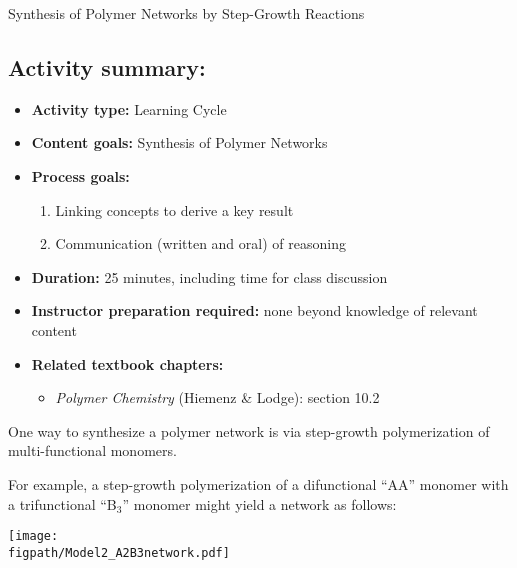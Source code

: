 \begin{activity}[extension]{Synthesis of Polymer Networks by Step-Growth Reactions}
\begin{instructornotes}
	\subsection*{Activity summary:}
	\begin{itemize}
		\item \textbf{Activity type:} Learning Cycle
		\item \textbf{Content goals:} Synthesis of Polymer Networks
		\item \textbf{Process goals:} %
			\begin{enumerate}
				\item Linking concepts to derive a key result
				\item Communication (written and oral) of reasoning
			\end{enumerate}
		\item \textbf{Duration:} 25 minutes, including time for class discussion
		\item \textbf{Instructor preparation required:} none beyond knowledge of relevant content
		\item \textbf{Related textbook chapters:}
			\begin{itemize}
				\item \emph{Polymer Chemistry} (Hiemenz \& Lodge): section 10.2
			\end{itemize}
	\end{itemize}
	
\end{instructornotes}

\begin{model}

	One way to synthesize a polymer network is via step-growth polymerization of multi-functional monomers.
	
	For example, a step-growth polymerization of a difunctional ``AA'' monomer with a trifunctional ``B$_3$'' monomer might yield a network as follows:
	
	\centerline{\texttt{[image: \\figpath/Model2\_A2B3network.pdf]}}

\end{model}


\end{activity}
